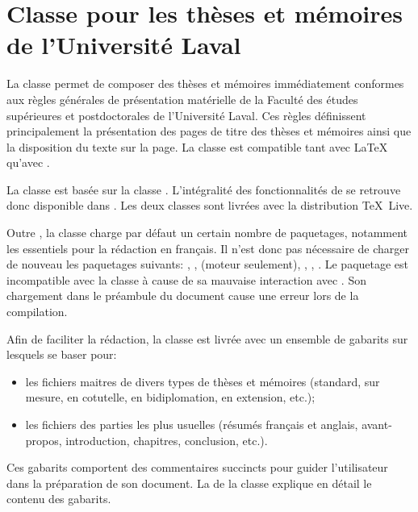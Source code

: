 
\chapter{Classe pour les thèses et mémoires de
  l'Université Laval}
\label{chap:ulthese}

La classe  \citep{ulthese} permet de composer des
thèses et mémoires immédiatement conformes aux règles générales de
présentation matérielle de la Faculté des études supérieures et
postdoctorales de l'Université Laval. Ces règles définissent
principalement la présentation des pages de titre des thèses et
mémoires ainsi que la disposition du texte sur la page. La classe est
compatible tant avec {\LaTeX} qu'avec {\XeLaTeX}.

La classe  est basée sur la classe .
L'intégralité des fonctionnalités de  se retrouve donc
disponible dans . Les deux classes sont livrées avec la
distribution {\TeX}~Live.

Outre , la classe charge par défaut un certain nombre de
paquetages, notamment les essentiels pour la rédaction en français. Il
n'est donc pas nécessaire de charger de nouveau les paquetages
suivants: , ,  
(moteur {\XeLaTeX} seulement), , ,
. Le paquetage  est incompatible avec la
classe à cause de sa mauvaise interaction avec . Son
chargement dans le préambule du document cause une erreur lors de la
compilation.

Afin de faciliter la rédaction, la classe est livrée avec un ensemble
de gabarits sur lesquels se baser pour:
\begin{itemize}
\item les fichiers maitres de divers types de thèses et mémoires
  (standard, sur mesure, en cotutelle, en bidiplomation, en
  extension, etc.);
\item les fichiers des parties les plus usuelles (résumés français
  et anglais, avant-propos, introduction, chapitres, conclusion,
  etc.).
\end{itemize}
Ces gabarits comportent des commentaires succincts pour guider
l'utilisateur dans la préparation de son document. La
de la classe explique en détail le contenu des gabarits.

